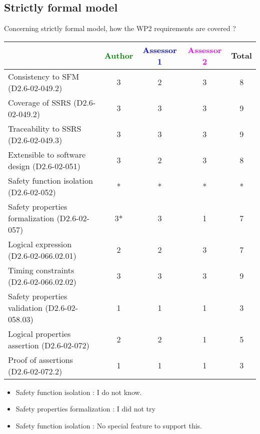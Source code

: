\subsection{Strictly formal model}

Concerning strictly formal model, how the WP2 requirements are covered ?

\begin{tabular}{|l | c | c | c | c|}
\hline
& \textcolor{green}{Author} & \textcolor{blue}{Assessor 1} & \textcolor{magenta}{Assessor 2} & Total \\
\hline 
Consistency to SFM (D2.6-02-049.2) &3 & 2& 3 & 8 \\
\hline
Coverage of SSRS (D2.6-02-049.2)  & 3& 3& 3& 9 \\
\hline
Traceability to  SSRS (D2.6-02-049.3)  & 3& 3& 3& 9 \\
\hline
Extensible to software design (D2.6-02-051)  &3 & 2& 3& 8  \\
\hline
Safety function isolation (D2.6-02-052)  & *  & * & * & * \\
\hline 
Safety properties formalization (D2.6-02-057)  &3* & 3 & 1 & 7 \\
\hline
Logical expression (D2.6-02-066.02.01)  &2 & 2& 3 & 7  \\
\hline
Timing constraints (D2.6-02-066.02.02)  &3 & 3& 3& 9 \\
\hline
Safety properties validation (D2.6-02-058.03)  &1 & 1& 1&  3 \\
\hline
Logical properties assertion (D2.6-02-072)  &2 & 2& 1& 5 \\
\hline
Proof of assertions (D2.6-02-072.2)  &1 & 1& 1& 3 \\
\hline
\end{tabular}

\begin{author_comment}
\begin{itemize}
\item Safety function isolation :  I do not know.
\item Safety properties formalization : I did not try
\end{itemize}

\end{author_comment}

\begin{assessor1}
\begin{itemize}
\item Safety function isolation :  No special feature to support this.
\end{itemize}

\end{assessor1}

